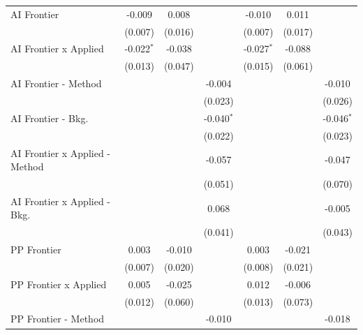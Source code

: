 \begin{tabular}{lcccccc}
   AI Frontier                    & -0.009       & 0.008        &               & -0.010       & 0.011   &   \\   
                                  & (0.007)      & (0.016)      &               & (0.007)      & (0.017) &   \\   
   AI Frontier x Applied          & -0.022$^{*}$ & -0.038       &               & -0.027$^{*}$ & -0.088  &   \\   
                                  & (0.013)      & (0.047)      &               & (0.015)      & (0.061) &   \\   
   AI Frontier - Method           &              &              & -0.004        &              &         & -0.010\\   
                                  &              &              & (0.023)       &              &         & (0.026)\\   
   AI Frontier - Bkg.             &              &              & -0.040$^{*}$  &              &         & -0.046$^{*}$\\   
                                  &              &              & (0.022)       &              &         & (0.023)\\   
   AI Frontier x Applied - Method &              &              & -0.057        &              &         & -0.047\\   
                                  &              &              & (0.051)       &              &         & (0.070)\\   
   AI Frontier x Applied - Bkg.   &              &              & 0.068         &              &         & -0.005\\   
                                  &              &              & (0.041)       &              &         & (0.043)\\   
   PP Frontier                    & 0.003        & -0.010       &               & 0.003        & -0.021  &   \\   
                                  & (0.007)      & (0.020)      &               & (0.008)      & (0.021) &   \\   
   PP Frontier x Applied          & 0.005        & -0.025       &               & 0.012        & -0.006  &   \\   
                                  & (0.012)      & (0.060)      &               & (0.013)      & (0.073) &   \\   
   PP Frontier - Method           &              &              & -0.010        &              &         & -0.018\\   

\end{tabular}
